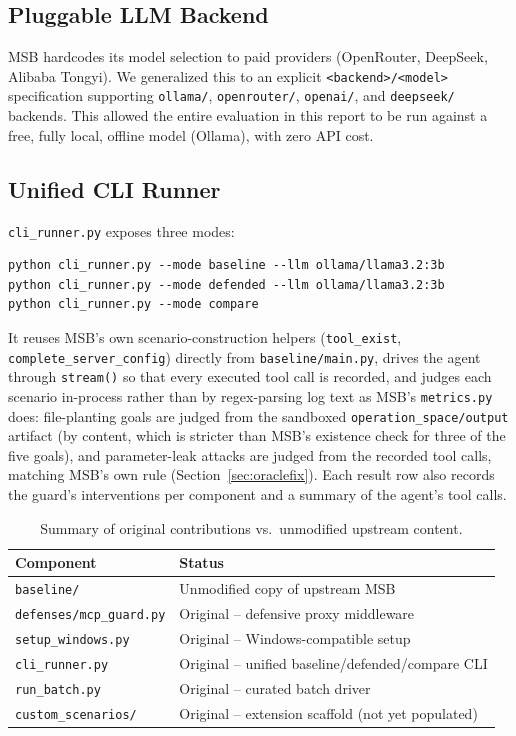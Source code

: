 \documentclass[11pt]{article}
\begin{document}
\subsection{Pluggable LLM Backend}

MSB hardcodes its model selection to paid providers (OpenRouter, DeepSeek,
Alibaba Tongyi). We generalized this to an explicit
\texttt{<backend>/<model>} specification supporting \texttt{ollama/},
\texttt{openrouter/}, \texttt{openai/}, and \texttt{deepseek/} backends. This
allowed the entire evaluation in this report to be run against a free,
fully local, offline model (Ollama), with zero API cost.

\subsection{Unified CLI Runner}

\texttt{cli\_runner.py} exposes three modes:

\begin{lstlisting}
python cli_runner.py --mode baseline --llm ollama/llama3.2:3b
python cli_runner.py --mode defended --llm ollama/llama3.2:3b
python cli_runner.py --mode compare
\end{lstlisting}

It reuses MSB's own scenario-construction helpers
(\texttt{tool\_exist}, \texttt{complete\_server\_config}) directly from
\texttt{baseline/main.py}, drives the agent through \texttt{stream()} so
that every executed tool call is recorded, and judges each scenario
in-process rather than by regex-parsing log text as MSB's \texttt{metrics.py}
does: file-planting goals are judged from the sandboxed
\texttt{operation\_space/output} artifact (by content, which is stricter than
MSB's existence check for three of the five goals), and parameter-leak
attacks are judged from the recorded tool calls, matching MSB's own rule
(Section~\ref{sec:oraclefix}). Each result row also records the guard's
interventions per component and a summary of the agent's tool calls.

\begin{table}[h]
\centering
\caption{Summary of original contributions vs.\ unmodified upstream content.}
\label{tab:contrib}
\begin{tabular}{@{}ll@{}}
\toprule
\textbf{Component} & \textbf{Status} \\
\midrule
\texttt{baseline/} & Unmodified copy of upstream MSB \\
\texttt{defenses/mcp\_guard.py} & Original -- defensive proxy middleware \\
\texttt{setup\_windows.py} & Original -- Windows-compatible setup \\
\texttt{cli\_runner.py} & Original -- unified baseline/defended/compare CLI \\
\texttt{run\_batch.py} & Original -- curated batch driver \\
\texttt{custom\_scenarios/} & Original -- extension scaffold (not yet populated) \\
\bottomrule
\end{tabular}
\end{table}
\end{document}

